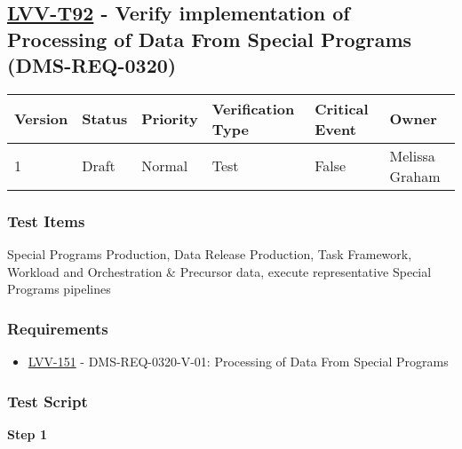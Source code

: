 \hypertarget{lvv-t92---verify-implementation-of-processing-of-data-from-special-programs-dms-req-0320}{%
\subsection{\texorpdfstring{\href{https://jira.lsstcorp.org/secure/Tests.jspa\#/testCase/LVV-T92}{LVV-T92}
- Verify implementation of Processing of Data From Special Programs
(DMS-REQ-0320)}{LVV-T92 - Verify implementation of Processing of Data From Special Programs (DMS-REQ-0320)}}\label{lvv-t92---verify-implementation-of-processing-of-data-from-special-programs-dms-req-0320}}

\begin{longtable}[]{@{}llllll@{}}
\toprule
Version & Status & Priority & Verification Type & Critical Event &
Owner\tabularnewline
\midrule
\endhead
1 & Draft & Normal & Test & False & Melissa Graham\tabularnewline
\bottomrule
\end{longtable}

\hypertarget{test-items-68}{%
\subsubsection{Test Items}\label{test-items-68}}

Special Programs Production, Data Release Production, Task Framework,
Workload and Orchestration \& Precursor data, execute representative
Special Programs pipelines

\hypertarget{requirements-69}{%
\subsubsection{Requirements}\label{requirements-69}}

\begin{itemize}
\tightlist
\item
  \href{https://jira.lsstcorp.org/browse/LVV-151}{LVV-151} -
  DMS-REQ-0320-V-01: Processing of Data From Special Programs
\end{itemize}

\hypertarget{test-script-69}{%
\subsubsection{Test Script}\label{test-script-69}}

\textbf{Step 1}\\
~\\
~\\

